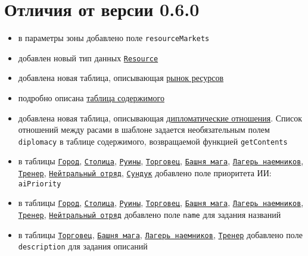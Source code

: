 \section{Отличия от версии 0.6.0}
\begin{itemize}
\item в параметры зоны добавлено поле \texttt{resourceMarkets}
\item добавлен новый тип данных \hyperref[resourceTypes]{\texttt{Resource}}
\item добавлена новая таблица, описывающая \hyperref[resourcemarket]{рынок ресурсов}
\item подробно описана \hyperref[contentsTable]{таблица содержимого}
\item добавлена новая таблица, описывающая \hyperref[diplomacy]{дипломатические отношения}. Список отношений между расами в шаблоне задается необязательным полем \texttt{diplomacy} в таблице содержимого, возвращаемой функцией \texttt{getContents}
\item в таблицы \hyperref[city]{\texttt{Город}}, \hyperref[capital]{\texttt{Столица}}, \hyperref[ruin]{\texttt{Руины}},  \hyperref[merchant]{\texttt{Торговец}}, \hyperref[mage]{\texttt{Башня мага}}, \hyperref[mercenary]{\texttt{Лагерь наемников}}, \hyperref[trainer]{\texttt{Тренер}}, \hyperref[neutralStacks]{\texttt{Нейтральный отряд}}, \hyperref[bags]{\texttt{Сундук}} добавлено поле приоритета ИИ: \texttt{aiPriority}
\item в таблицы \hyperref[city]{\texttt{Город}}, \hyperref[capital]{\texttt{Столица}}, \hyperref[ruin]{\texttt{Руины}},  \hyperref[merchant]{\texttt{Торговец}}, \hyperref[mage]{\texttt{Башня мага}}, \hyperref[mercenary]{\texttt{Лагерь наемников}}, \hyperref[trainer]{\texttt{Тренер}}, \hyperref[neutralStacks]{\texttt{Нейтральный отряд}} добавлено поле \texttt{name} для задания названий
\item в таблицы \hyperref[merchant]{\texttt{Торговец}}, \hyperref[mage]{\texttt{Башня мага}}, \hyperref[mercenary]{\texttt{Лагерь наемников}}, \hyperref[trainer]{\texttt{Тренер}} добавлено поле \texttt{description} для задания описаний
\end{itemize}